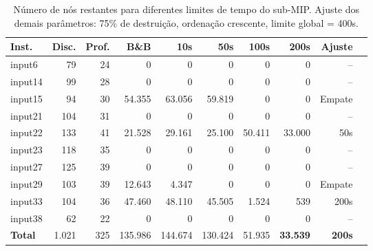
\begin{table}[htbp]
\centering
\caption{Número de nós restantes para diferentes limites de tempo do sub-MIP. Ajuste dos demais parâmetros: 75\% de destruição, ordenação crescente, limite global = 400s.}
\label{tab:lns_time_nodes}
\small
\begin{tabular}{@{}lrrrrrrrrr@{}}
\toprule
\textbf{Inst.} & \textbf{Disc.} & \textbf{Prof.} & \textbf{B\&B} & \textbf{10s} & \textbf{50s} & \textbf{100s} & \textbf{200s} & \textbf{Ajuste} \\
\midrule
input6  & 79  & 24 & 0      & 0      & 0      & 0      & 0      & -- \\
input14 & 99  & 28 & 0      & 0      & 0      & 0      & 0      & -- \\
input15 & 94  & 30 & 54.355 & 63.056 & 59.819 & 0      & 0      & Empate \\
input21 & 104 & 31 & 0      & 0      & 0      & 0      & 0      & -- \\
input22 & 133 & 41 & 21.528 & 29.161 & 25.100 & 50.411 & 33.000 & 50s \\
input23 & 118 & 35 & 0      & 0      & 0      & 0      & 0      & -- \\
input27 & 125 & 39 & 0      & 0      & 0      & 0      & 0      & -- \\
input29 & 103 & 39 & 12.643 & 4.347  & 0      & 0      & 0      & Empate \\
input33 & 104 & 36 & 47.460 & 48.110 & 45.505 & 1.524  & 539 & 200s \\
input38 & 62  & 22 & 0      & 0      & 0      & 0      & 0      & -- \\
\midrule
\textbf{Total} & 1.021 & 325 & 135.986 & 144.674 & 130.424 & 51.935 & \textbf{33.539} & \textbf{200s} \\
\bottomrule
\end{tabular}
\end{table}
